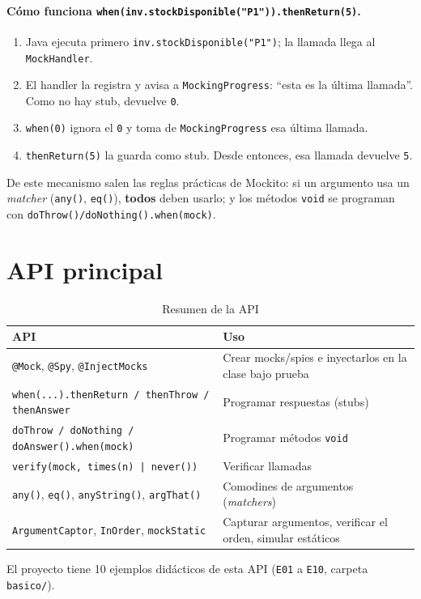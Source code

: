 \documentclass[11pt,a4paper,oneside]{report}
\newcommand{\code}[1]{\texttt{#1}}
\begin{document}
\paragraph{Cómo funciona \code{when(inv.stockDisponible("P1")).thenReturn(5)}.}
\begin{enumerate}
  \item Java ejecuta primero \code{inv.stockDisponible("P1")}; la llamada llega al \code{MockHandler}.
  \item El handler la registra y avisa a \code{MockingProgress}: ``esta es la última llamada''. Como no hay stub, devuelve \code{0}.
  \item \code{when(0)} ignora el \code{0} y toma de \code{MockingProgress} esa última llamada.
  \item \code{thenReturn(5)} la guarda como stub. Desde entonces, esa llamada devuelve \code{5}.
\end{enumerate}
De este mecanismo salen las reglas prácticas de Mockito: si un argumento usa un \emph{matcher} (\code{any()}, \code{eq()}), \textbf{todos} deben usarlo; y los métodos \code{void} se programan con \code{doThrow()/doNothing().when(mock)}.

\section{API principal}
\begin{table}[H]
\centering
\caption{Resumen de la API}
\small
\begin{tabularx}{\linewidth}{lX}
\toprule
\textbf{API} & \textbf{Uso}\\
\midrule
\code{@Mock}, \code{@Spy}, \code{@InjectMocks} & Crear mocks/spies e inyectarlos en la clase bajo prueba\\
\code{when(...).thenReturn / thenThrow / thenAnswer} & Programar respuestas (stubs)\\
\code{doThrow / doNothing / doAnswer().when(mock)} & Programar métodos \code{void}\\
\code{verify(mock, times(n) | never())} & Verificar llamadas\\
\code{any()}, \code{eq()}, \code{anyString()}, \code{argThat()} & Comodines de argumentos (\emph{matchers})\\
\code{ArgumentCaptor}, \code{InOrder}, \code{mockStatic} & Capturar argumentos, verificar el orden, simular estáticos\\
\bottomrule
\end{tabularx}
\end{table}
El proyecto tiene 10 ejemplos didácticos de esta API (\code{E01} a \code{E10}, carpeta \code{basico/}).
\end{document}
